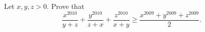 Let $x,y,z>0$. Prove that
\[\dfrac{x^{2010}}{y+z}+\dfrac{y^{2010}}{z+x}+\dfrac{z^{2010}}{x+y}\ge\dfrac{x^{2009}+y^{2009}+z^{2009}}{2}.\]

